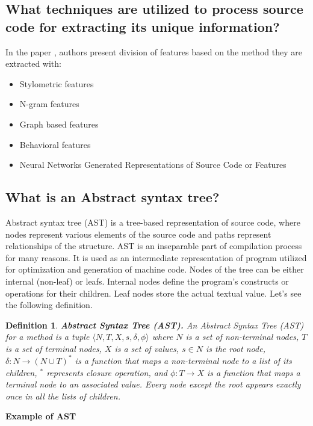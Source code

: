 \documentclass[10pt,english,a4paper]{report}
\newtheorem{definition}{Definition}
\begin{document}
\subsection{What techniques are utilized to process source code for extracting its unique information?}

In the paper \cite{information}, authors present division of features based on the method they are extracted with:

\begin{itemize}
    \item Stylometric features
    \item N-gram features
    \item Graph based features
    \item Behavioral features
    \item Neural Networks Generated Representations of Source Code or Features
\end{itemize}



\subsection{What is an Abstract syntax tree?}
\quad Abstract syntax tree (AST) is a tree-based representation of source code, where nodes represent various elements of the source code and paths represent relationships of the structure. AST is an inseparable part of compilation process for many reasons. It is used as an intermediate representation of program utilized for optimization and generation of machine code. Nodes of the tree can be either internal (non-leaf) or leafs. Internal nodes define the program's constructs or operations for their children. Leaf nodes store the actual textual value. Let's see the following definition.
\begin{definition}
\cite{sun2023AST}
\textbf{Abstract Syntax Tree (AST).} An Abstract Syntax Tree (AST) for a method is a tuple
$\langle N, T, X, s, \delta, \phi \rangle$ where $N$ is a set of non-terminal nodes, $T$ is a set of terminal nodes, $X$ is a set of values, $s \in N$ is the root node, $\delta : N \to (N \cup T)^*$ is a function that maps a non-terminal node to a list of its children, $^*$ represents closure operation, and $\phi : T \to X$ is a function that maps a terminal node to an associated value. Every node except the root appears exactly once in all the lists of children.
\end{definition}

\textbf{Example of AST}
\end{document}
